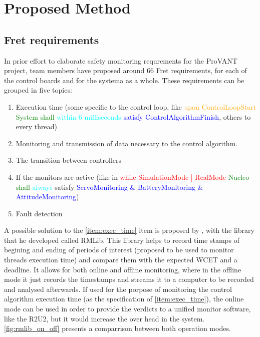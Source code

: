 \chapter{Proposed Method}

\section{Fret requirements}

In prior effort to elaborate safety monitoring requrements for the ProVANT project, 
team members
have proposed around 66 Fret requirements, for each of the control boards and for the systema as a whole. These requirements can be grouped in five topics:
\begin{enumerate}
	\item Execution time (some specific to the control loop, like \textcolor{orange}{upon ControlLoopStart} \textcolor{green}{System shall} \textcolor{cyan}{within 6 milliseconds} \textcolor{blue}{satisfy ControlAlgorithmFinish}, others to every thread)
	\label{item:exec_time}
	
	\item Monitoring and transmission of data necessary to the control algorithm.
	\label{item:mon_trans}

	\item The transition between controllers
	
	\item If the monitors are active (like in \textcolor{red}{while SimulationMode | RealMode} \textcolor{green}{Nucleo shall} \textcolor{cyan}{always} satisfy \textcolor{blue}{ServoMonitoring \& BatteryMonitoring \& AttitudeMonitoring})
	
	\item Fault detection
\end{enumerate}

A possible solution to the \autoref{item:exec_time} item is proposed by \textcite{broering_runtime_2023}, with the library that he developed called \gls{RMLib}. This library helps to record time stamps of begining and ending of periods of interest (proposed to be used to monitor threads execution time) and compare them with the expected \gls{WCET} and a deadline. It allows for both online and offline monitoring, where in the offline mode it just records the timestamps and streams it to a computer to be recorded and analysed afterwards. 
If used for the porpose of monitoring the control algorithm execution time (as the specification of \autoref{item:exec_time}), the online mode can be used in order to provide the verdicts to a unified monitor software, like the R2U2, but it would increase the over head in the system. \autoref{fig:rmlib_on_off} presents a comparrison between both operation modes.

